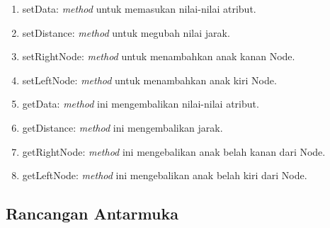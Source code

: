 \begin{itemize}
\begin{enumerate}

\item setData: \textit{method} untuk memasukan nilai-nilai atribut.

\item setDistance: \textit{method} untuk megubah nilai jarak.

\item setRightNode: \textit{method} untuk menambahkan anak kanan Node.

\item setLeftNode: \textit{method} untuk menambahkan anak kiri Node.

\item getData: \textit{method} ini mengembalikan nilai-nilai atribut.

\item getDistance: \textit{method} ini mengembalikan jarak.

\item getRightNode: \textit{method} ini mengebalikan anak belah kanan dari Node.

\item getLeftNode: \textit{method} ini mengebalikan anak belah kiri dari Node.

\end{enumerate}



\end{itemize}




\subsection{Rancangan Antarmuka}